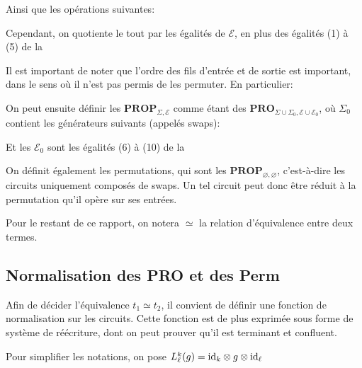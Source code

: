 \documentclass[12pt, a4paper]{article}
\newcommand{\layer}[3]{L^{\smash{#1}}_{\smash{#2}}(#3)}
\def\pro#1{ \mathbf{PRO}_{ #1 } }
\def\prop#1{ \mathbf{PROP}_{ #1 } }
\begin{document}
\begin{center}
    
\end{center}

Ainsi que les opérations suivantes:

\begin{center}
    
\end{center}

Cependant, on quotiente le tout par les égalités de $\mathcal E$, en plus des égalités (1) à (5) de la \hyperref[fig:coherencelaws]{}


Il est important de noter que l'ordre des fils d'entrée et de sortie est important, dans le sens où il n'est pas permis de les permuter. En particulier:

\begin{center}
    
\end{center}


On peut ensuite définir les $\prop{\Sigma, \mathcal E}$ comme étant des $\pro{\Sigma \cup \Sigma_0, \mathcal E \cup \mathcal E_0}$, où $\Sigma_0$ contient les générateurs suivants (appelés swaps):

\begin{center}
    
\end{center}

Et les $\mathcal E_0$ sont les égalités (6) à (10) de la \hyperref[fig:coherencelaws]{}

On définit également les permutations, qui sont les $\prop{\varnothing, \varnothing}$, c'est-à-dire les circuits uniquement composés de swaps. Un tel circuit peut donc être réduit à la permutation qu'il opère sur ses entrées.

Pour le restant de ce rapport, on notera $\simeq$ la relation d'équivalence entre deux termes.


\subsection{Normalisation des PRO et des Perm}

Afin de décider l'équivalence $t_1 \simeq t_2$, il convient de définir une fonction de normalisation sur les circuits. Cette fonction est de plus exprimée sous forme de système de réécriture, dont on peut prouver qu'il est terminant et confluent.

Pour simplifier les notations, on pose $\layer{k}{\ell}{g} = \textup{id}_k \otimes g \otimes \textup{id}_\ell$
\end{document}
